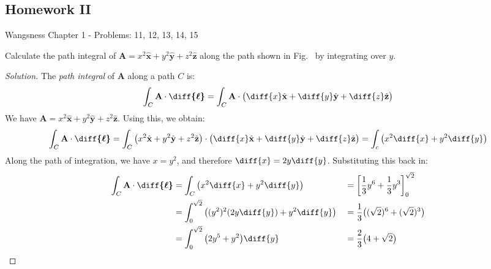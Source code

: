 \documentclass[crop=false,class=article,oneside]{standalone}
\begin{document}
    \subsection{Homework II}
        Wangsness Chapter 1 - Problems: 11, 12, 13, 14, 15
        \begin{problem}[Wangsness 1-11]
            \label{problem:EMAG_1_Wangsness_1_11}
            Calculate the path integral of
            $\mathbf{A}=x^{2}\hat{\mathbf{x}}
            +y^{2}\hat{\mathbf{y}}+z^{2}\hat{\mathbf{z}}$
            along the path shown in Fig.~
            by integrating over $y$.
        \end{problem}
        \begin{proof}[Solution]
            The \textit{path integral} of $\mathbf{A}$
            along a path $C$ is:
            \begin{equation*}
                \int_{C}\mathbf{A}\cdot\boldsymbol{\diff{\ell}}
                =\int_{C}\mathbf{A}\cdot\big(
                    \diff{x}\hat{\mathbf{x}}
                   +\diff{y}\hat{\mathbf{y}}
                   +\diff{z}\hat{\mathbf{z}}
                \big)
            \end{equation*}
            We have
            $\mathbf{A}%
             =x^{2}\hat{\mathbf{x}}%
             +y^{2}\hat{\mathbf{y}}%
             +z^{2}\hat{\mathbf{z}}$.
            Using this, we obtain:
            \begin{equation*}
                \int_{C}\mathbf{A}\cdot\boldsymbol{\diff{\ell}}
                =\int_{C}\big(
                    x^{2}\hat{\mathbf{x}}+y^{2}
                    \hat{\mathbf{y}}+z^{2}\hat{\mathbf{z}}
                \big)
                \cdot\big(
                     \diff{x}\hat{\mathbf{x}}
                    +\diff{y}\hat{\mathbf{y}}
                    +\diff{z}\hat{\mathbf{z}}
                \big)
                =\int_{c}\big(x^{2}\diff{x}+y^{2}\diff{y}\big)
            \end{equation*}
            Along the path of integration, we have $x=y^{2}$,
            and therefore $\diff{x}=2y\diff{y}$.
            Substituting this back in:
            \begin{align*}
                \int_{C}\mathbf{A}\cdot\boldsymbol{\diff{\ell}}
                &=\int_{C}\big(x^{2}\diff{x}+y^{2}\diff{y}\big)
                &
                &=\bigg[
                     \frac{1}{3}y^{6}
                    +\frac{1}{3}y^{3}
                \bigg]_{0}^{\sqrt{2}}\\
                &=\int_{0}^{\sqrt{2}}
                  \big((y^{2})^{2}(2y\diff{y})+y^{2}\diff{y}\big)
                &
                &=\frac{1}{3}\big(
                    (\sqrt{2})^{6}+(\sqrt{2})^{3}
                \big)\\
                &=\int_{0}^{\sqrt{2}}
                  \big(2y^{5}+y^{2}\big)\diff{y}
                &
                &=\frac{2}{3}\big(4+\sqrt{2}\big)\\
            \end{align*}
        \end{proof}
\end{document}
